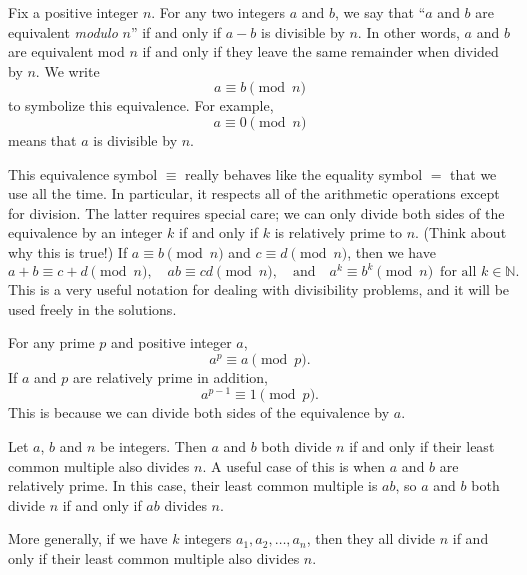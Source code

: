 \begin{technique}
    \label{teq: modulo}
    Fix a positive integer $n$. For any
    two integers $a$ and $b$, we say that ``$a$ and $b$ are equivalent
    \emph{modulo} $n$'' if and only if $a - b$ is divisible by $n$. In other
    words, $a$ and $b$ are equivalent mod $n$ if and only if they leave the
    same remainder when divided by $n$. We write
    \[ a \equiv b \pmod{n} \]
    to symbolize this equivalence. For example,
    \[ a \equiv 0 \pmod{n} \]
    means that $a$ is divisible by $n$.

    This equivalence symbol $\equiv$ really behaves like the equality symbol $=$
    that we use all the time. In particular, it respects all of the arithmetic
    operations except for division. The latter requires special care; we can
    only divide both sides of the equivalence by an integer $k$ if and only if
    $k$ is relatively prime to $n$. (Think about why this is true!) If $a \equiv
    b \pmod{n}$ and $c \equiv d \pmod{n}$, then we have
    \[ a + b \equiv c + d \pmod{n}, \quad ab \equiv cd \pmod{n},
    \quad\text{and}\quad a^k \equiv b^k \pmod{n}\,\text{ for all $k\in\mathbb{N}$}. \]
    This is a very useful notation for dealing with divisibility problems, and
    it will be used freely in the solutions.
\end{technique}

\begin{theorem}
    \label{thm: FLT}
    For any prime $p$ and positive integer $a$,
    \[ a^p \equiv a \pmod{p}.\] 
    If $a$ and $p$ are relatively prime in addition,
    \[ a^{p - 1} \equiv 1 \pmod{p}.\]
    This is because we can divide both sides of the equivalence by $a$.
\end{theorem}

\begin{lemma}
    \label{lem: weakCRT} 
    Let $a$, $b$ and $n$ be integers. Then
    $a$ and $b$ both divide $n$ if and only if their least common multiple also
    divides $n$. A useful case of this is when $a$ and $b$ are relatively prime.
    In this case, their least common multiple is $ab$, so $a$ and $b$ both
    divide $n$ if and only if $ab$ divides $n$.

    More generally, if we have $k$ integers $a_1, a_2, \ldots,
    a_n$, then they all divide $n$ if and only if their least common multiple
    also divides $n$.
\end{lemma}

